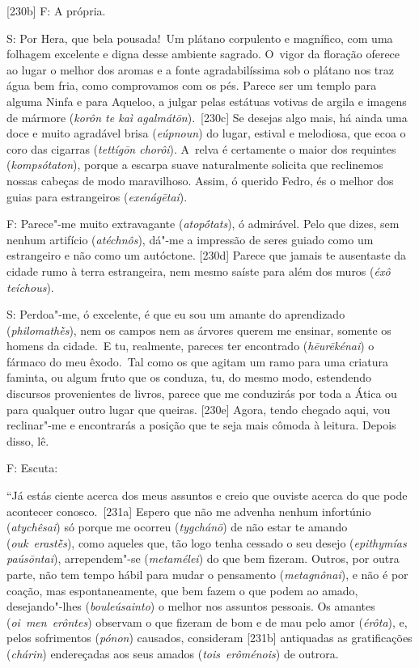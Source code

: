  

[230b] F: A própria.

 

S: Por Hera, que bela pousada!~Um plátano corpulento e magnífico, com
uma folhagem excelente e digna desse ambiente sagrado. O~vigor da
floração oferece ao lugar o melhor dos aromas e a fonte agradabilíssima
sob o plátano nos traz água bem fria, como comprovamos com os pés.
Parece ser um templo para alguma Ninfa e para Aqueloo, a julgar pelas
estátuas votivas de argila e imagens de mármore (\emph{korôn te kaì
agalmátōn}).~[230c] Se desejas algo mais, há ainda uma doce e muito
agradável brisa (\emph{eúpnoun}) do lugar, estival e melodiosa, que ecoa
o coro das cigarras (\emph{tettígōn chorôi}). A~relva é certamente o
maior dos requintes (\emph{kompsótaton}), porque a escarpa suave
naturalmente solicita que reclinemos nossas cabeças de modo maravilhoso.
Assim, ó querido Fedro, és o melhor dos guias para estrangeiros
(\emph{exenágētai}).

 

F: Parece"-me muito extravagante (\emph{atopṓtats}), ó admirável. Pelo
que dizes, sem nenhum artifício (\emph{atéchnôs}), dá"-me a impressão de
seres guiado como um estrangeiro e não como um autóctone. [230d]
Parece que jamais te ausentaste da cidade rumo à terra estrangeira, nem
mesmo saíste para além dos muros (\emph{éxô teíchous}).

 

S: Perdoa"-me, ó excelente, é que eu sou um amante do aprendizado
(\emph{philomathḕs}), nem os campos nem as árvores querem me ensinar,
somente os homens da cidade.~E tu, realmente, pareces ter encontrado
(\emph{hēurēkénai}) o fármaco do meu êxodo.~Tal como os que agitam um
ramo para uma criatura faminta, ou algum fruto que os conduza, tu, do
mesmo modo, estendendo discursos provenientes de livros, parece que me
conduzirás por toda a Ática ou para qualquer outro lugar que queiras.
[230e] Agora, tendo chegado aqui, vou reclinar"-me e encontrarás a
posição que te seja mais cômoda à leitura. Depois disso, lê.

 

F: Escuta:

 

``Já estás ciente acerca dos meus assuntos e creio que ouviste acerca do
que pode acontecer conosco.~[231a] Espero que não me advenha nenhum
infortúnio (\emph{atychêsai}) só porque me ocorreu (\emph{tygchánō}) de
não estar te amando (\emph{ouk}~\emph{erastḕs}), como aqueles que, tão
logo tenha cessado o seu desejo (\emph{epithymías paúsōntai}),
arrependem"-se (\emph{metamélei}) do que bem fizeram. Outros, por outra
parte, não tem tempo hábil para mudar o pensamento (\emph{metagnônai}),
e não é por coação, mas espontaneamente, que bem fazem o que podem ao
amado, desejando"-lhes (\emph{bouleúsainto}) o melhor nos assuntos
pessoais. Os amantes (\emph{oi}~\emph{men}~\emph{erôntes}) observam o
que fizeram de bom e de mau pelo amor (\emph{érôta}), e, pelos
sofrimentos (\emph{pónon}) causados, consideram [231b] antiquadas as
gratificações (\emph{chárin}) endereçadas aos seus amados
(\emph{tois}~\emph{erôménois}) de outrora.

